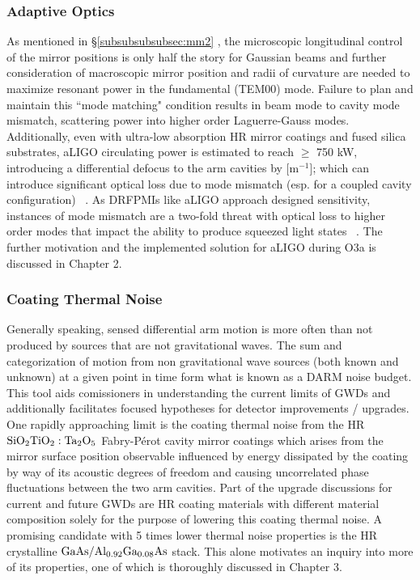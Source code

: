 \subsubsection{Adaptive Optics}
As mentioned in \hyperref[subsubsubsubsec:mm2]{\S \ref*{subsubsubsubsec:mm2}} , the microscopic longitudinal control of the mirror positions is only half the story for Gaussian beams and further consideration of macroscopic mirror position and radii of curvature are needed to maximize resonant power in the fundamental (TEM00) mode. Failure to plan and maintain this ``mode matching" condition results in beam mode to cavity mode mismatch, scattering power into higher order Laguerre-Gauss modes. Additionally, even with ultra-low absorption HR mirror coatings and fused silica substrates, aLIGO circulating power is estimated to reach $\geq$ 750 kW, introducing a differential defocus to the arm cavities by [$\mathrm{m}^{-1}$]; which can introduce significant optical loss due to mode mismatch (esp. for a coupled cavity configuration) ~\cite{tvo}. As DRFPMIs like aLIGO approach designed sensitivity, instances of mode mismatch are a two-fold threat with optical loss to higher order modes that impact the ability to produce squeezed light states ~\cite{oelker:2014}. The further motivation and the implemented solution for aLIGO during O3a is discussed in Chapter 2. 

\subsubsection{Coating Thermal Noise}\label{subsubsec:introctn}
Generally speaking, sensed differential arm motion is more often than not produced by sources that are not gravitational waves. The sum and categorization of motion from non gravitational wave sources (both known and unknown) at a given point in time form what is known as a DARM noise budget. This tool aids comissioners in understanding the current limits of GWDs and additionally facilitates focused hypotheses for detector improvements / upgrades. One rapidly approaching limit is the coating thermal noise from the HR $\mathrm{SiO_2}\mathrm{TiO_2:Ta_2O_5}$ Fabry-P\'erot cavity mirror coatings which arises from the mirror surface position observable influenced by energy dissipated by the coating by way of its acoustic degrees of freedom and causing uncorrelated phase fluctuations between the two arm cavities. Part of the upgrade discussions for current and future GWDs are HR coating materials with different material composition solely for the purpose of lowering this coating thermal noise. A promising candidate with 5 times lower thermal noise properties is the HR crystalline $\mathrm{GaAs}/\mathrm{Al_{0.92}Ga_{0.08}As}$ stack. This alone motivates an inquiry into more of its properties, one of which is thoroughly discussed in Chapter 3.   

